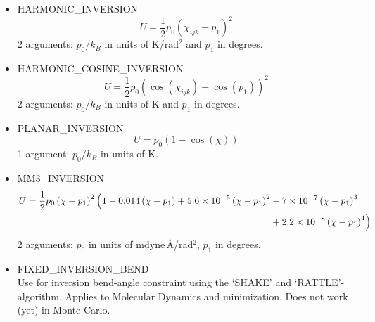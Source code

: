 \begin{itemize}
  \item{HARMONIC\_INVERSION}\\
 \begin{equation}
  U=\frac{1}{2}p_0\left(\chi_{ijk}-p_1\right)^2
  \end{equation}
  2 arguments: $p_0/k_B$ in units of K/rad$^2$ and $p_1$ in degrees.
  \item{HARMONIC\_COSINE\_INVERSION}\\
 \begin{equation}
  U=\frac{1}{2}p_0\left(\cos\left(\chi_{ijk}\right)-\cos\left(p_1\right)\right)^2
  \end{equation}
  2 arguments: $p_0/k_B$ in units of K and $p_1$ in degrees.
  \item{PLANAR\_INVERSION}\\
 \begin{equation}
  U=p_0\left(1-\cos\left(\chi\right)\right)
  \end{equation}
  1 argument: $p_0/k_B$ in units of K.
  \item{MM3\_INVERSION}\\
  \begin{equation}
  \begin{split}
  U=\frac{1}{2}p_0 \left(\chi-p_1\right)^2\Bigl(1-0.014\left(\chi-p_1\right)+
   5.6\times10^{-5}\left(\chi-p_1\right)^2&-7\times10^{-7}\left(\chi-p_1\right)^3\\
   &+2.2\times10^{-8}\left(\chi-p_1\right)^4
   \Bigr)
  \end{split}
  \end{equation}
  2 arguments: $p_0$ in units of mdyne\,\AA/rad$^2$, $p_1$ in degrees.

  \item{FIXED\_INVERSION\_BEND}\\
   Use for inversion bend-angle constraint using the `SHAKE' and `RATTLE'-algorithm. 
   Applies to Molecular Dynamics and minimization. Does not work (yet) in Monte-Carlo.
\end{itemize}

